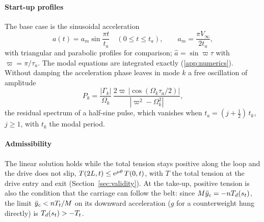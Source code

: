 \paragraph{Start-up profiles} The base case is the sinusoidal acceleration
\begin{equation}\label{eq:profile}
  a(t)=a_m\sin\frac{\pi t}{t_a}\quad(0\le t\le t_a),\qquad a_m=\frac{\pi V_\infty}{2t_a},
\end{equation}
with triangular and parabolic profiles for comparison; $\hat a=\sin\varpi\tau$ with
$\varpi=\pi/\tau_a$. The modal equations are integrated exactly (\cref{app:numerics}). Without
damping the acceleration phase leaves in mode $k$ a free oscillation of amplitude
\begin{equation}\label{eq:residual}
  P_k=\frac{|\Gamma_k|}{\Omega_k}\,\frac{2\varpi\,|\cos(\Omega_k\tau_a/2)|}{|\varpi^2-\Omega_k^2|},
\end{equation}
the residual spectrum of a half-sine pulse, which vanishes when $t_a=(j+\tfrac12)\,t_k$,
$j\ge1$, with $t_k$ the modal period.

\paragraph{Admissibility} The linear solution holds while the total tension stays positive
along the loop and the drive does not slip, $T(2L,t)\le\mathrm{e}^{\mu\theta}\,T(0,t)$, with $T$ the total
tension at the drive entry and exit (Section~\ref{sec:validity}). At the take-up, positive
tension is also the condition that the carriage can follow the belt: since
$M\ddot y_c=-n T_d(s_t)$, the limit $\ddot y_c<nT_t/M$ on its downward
acceleration ($g$ for a counterweight hung directly) is $T_d(s_t)>-T_t$.
